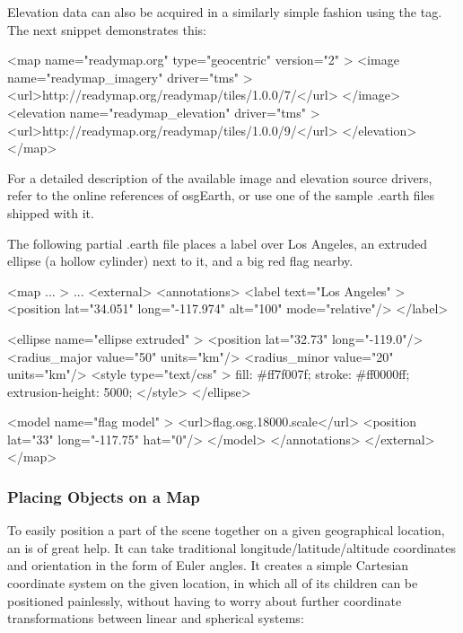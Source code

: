 Elevation data can also be acquired in a similarly simple fashion using the
 tag. The next snippet demonstrates this:

\begin{filelisting}
<map name="readymap.org" type="geocentric" version="2" >
    <image name="readymap_imagery" driver="tms" >
        <url>http://readymap.org/readymap/tiles/1.0.0/7/</url>
    </image>
    <elevation name="readymap_elevation" driver="tms" >
        <url>http://readymap.org/readymap/tiles/1.0.0/9/</url>
    </elevation>
</map>
\end{filelisting}

For a detailed description of the available image and elevation source drivers,
refer to the online references of osgEarth, or use one of the sample .earth
files shipped with it.

The following partial .earth file places a label over Los Angeles, an extruded
ellipse (a hollow cylinder) next to it, and a big red flag nearby.

\begin{filelisting}
<map ... >
    ...
    <external>
        <annotations>
            <label text="Los Angeles" >
                <position lat="34.051" long="-117.974" alt="100" mode="relative"/>
            </label>

            <ellipse name="ellipse extruded" >
                <position lat="32.73" long="-119.0"/>
                <radius_major value="50" units="km"/>
                <radius_minor value="20" units="km"/>
                <style type="text/css" >
                    fill:             #ff7f007f;
                    stroke:           #ff0000ff;
                    extrusion-height: 5000;
                </style>
            </ellipse>

            <model name="flag model" >
                <url>flag.osg.18000.scale</url>
                <position lat="33" long="-117.75" hat="0"/>
            </model>
        </annotations>
    </external>
</map>
\end{filelisting}

\subsubsection{Placing Objects on a Map}

To easily position a part of the scene together on a given geographical location,
an  is of great help. It can take
traditional longitude/latitude/altitude coordinates and orientation in the form
of Euler angles. It creates a simple Cartesian coordinate system on the given
location, in which all of its children can be positioned painlessly, without
having to worry about further coordinate transformations between linear and
spherical systems:

